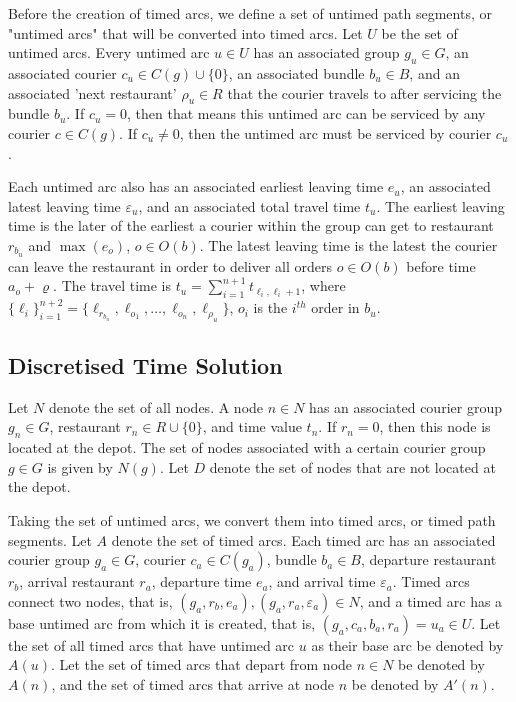 \documentclass{article}
\begin{document}
Before the creation of timed arcs, we define a set of untimed path segments, or "untimed arcs" that will be converted into timed arcs. Let $U$ be the set of untimed arcs. Every untimed arc $u\in U$ has an associated group $g_u\in G$, an associated courier $c_u\in C(g)\cup \{0\}$, an associated bundle $b_u\in B$, and an associated 'next restaurant' $\rho_u\in R$ that the courier travels to after servicing the bundle $b_u$. If $c_u=0$, then that means this untimed arc can be serviced by any courier $c\in C(g)$. If $c_u\neq 0$, then the untimed arc must be serviced by courier $c_u$. 

Each untimed arc also has an associated earliest leaving time $e_u$, an associated latest leaving time $\varepsilon_u$, and an associated total travel time $t_u$. The earliest leaving time is the later of the earliest a courier within the group can get to restaurant $r_{b_u}$ and $\max(e_o)$, $o\in O(b)$. The latest leaving time is the latest the courier can leave the restaurant in order to deliver all orders $o\in O(b)$ before time $a_o+\varrho$. The travel time is $t_u=\sum_{i=1}^{n+1}t_{\ell_i,\ell_i+1}$, where $\{\ell_i\}_{i=1}^{n+2}=\{\ell_{r_{b_u}}, \ell_{o_1}, \dots, \ell_{o_n}, \ell_{\rho_u}\}$, $o_i$ is the $i^{th}$ order in $b_u$.

\subsection{Discretised Time Solution}

Let $N$ denote the set of all nodes. A node $n\in N$ has an associated courier group $g_n\in G$, restaurant $r_n\in R\cup\{0\}$, and time value $t_n$. If $r_n=0$, then this node is located at the depot. The set of nodes associated with a certain courier group $g\in G$ is given by $N(g)$. Let $D$ denote the set of nodes that are not located at the depot.

Taking the set of untimed arcs, we convert them into timed arcs, or timed path segments. Let $A$ denote the set of timed arcs. Each timed arc has an associated courier group $g_a\in G$, courier $c_a\in C(g_a)$, bundle $b_a\in B$, departure restaurant $r_b$, arrival restaurant $r_a$, departure time $e_a$, and arrival time $\varepsilon_a$. Timed arcs connect two nodes, that is, $(g_a, r_b, e_a), (g_a, r_a, \varepsilon_a)\in N$, and a timed arc has a base untimed arc from which it is created, that is, $(g_a, c_a, b_a, r_a)=u_a\in U$. Let the set of all timed arcs that have untimed arc $u$ as their base arc be denoted by $A(u)$. Let the set of timed arcs that depart from node $n\in N$ be denoted by $A(n)$, and the set of timed arcs that arrive at node $n$ be denoted by $A'(n)$.
\end{document}
